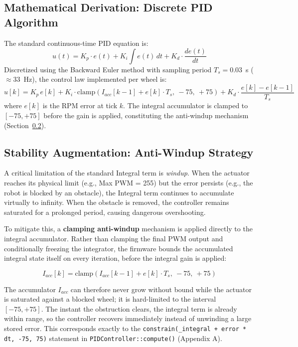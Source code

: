 \subsection{Mathematical Derivation: Discrete PID Algorithm}
\label{subsec:discrete_pid}

The standard continuous-time PID equation is:
\begin{equation}
    u(t) = K_p \cdot e(t) + K_i \int e(t) \, dt + K_d \cdot \frac{de(t)}{dt}
    \label{eq:pid_continuous}
\end{equation}
Discretized using the Backward Euler method with sampling period $T_s = 0.03$~s ($\approx$33~Hz), the control law implemented per wheel is:
\begin{equation}
    u[k] = K_p\,e[k] + K_i \cdot \mathrm{clamp}\!\left(I_{acc}[k-1] + e[k]\cdot T_s,\ -75,\ +75\right) + K_d \cdot \frac{e[k]-e[k-1]}{T_s}
    \label{eq:pid_discrete_total}
\end{equation}
where $e[k]$ is the RPM error at tick $k$. The integral accumulator is clamped to $[-75, +75]$ before the gain is applied, constituting the anti-windup mechanism (Section~\ref{subsec:anti_windup}).

\subsection{Stability Augmentation: Anti-Windup Strategy}
\label{subsec:anti_windup}

A critical limitation of the standard Integral term is \textit{windup}. When the actuator reaches its physical limit (e.g., Max PWM = 255) but the error persists (e.g., the robot is blocked by an obstacle), the Integral term continues to accumulate virtually to infinity. When the obstacle is removed, the controller remains saturated for a prolonged period, causing dangerous overshooting.

To mitigate this, a \textbf{clamping anti-windup} mechanism is applied directly to the integral accumulator. Rather than clamping the final PWM output and conditionally freezing the integrator, the firmware bounds the accumulated integral state itself on every iteration, before the integral gain is applied:

\begin{equation}
    I_{acc}[k] = \mathrm{clamp}\left( I_{acc}[k-1] + e[k] \cdot T_s,\ -75,\ +75 \right)
    \label{eq:anti_windup}
\end{equation}

The accumulator $I_{acc}$ can therefore never grow without bound while the actuator is saturated against a blocked wheel; it is hard-limited to the interval $[-75, +75]$. The instant the obstruction clears, the integral term is already within range, so the controller recovers immediately instead of unwinding a large stored error. This corresponds exactly to the \texttt{constrain(\_integral + error * dt, -75, 75)} statement in \texttt{PIDController::compute()} (Appendix A).

